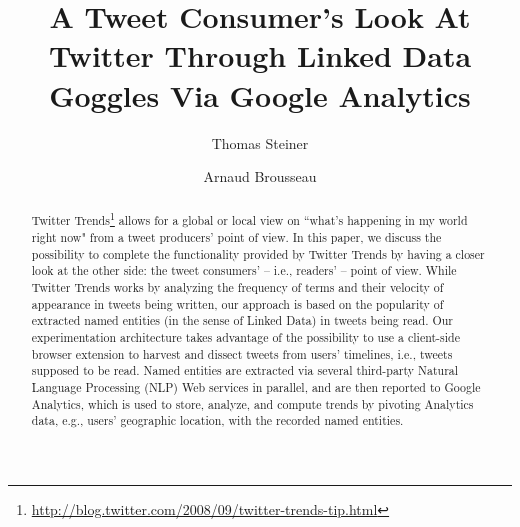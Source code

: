 \documentclass[runningheads,a4paper]{llncs}
\begin{document}
\mainmatter  %

\title{A Tweet Consumer's Look At Twitter Through Linked Data Goggles Via Google Analytics}


%
%
\author{Thomas Steiner \and Arnaud Brousseau}

%
%


\maketitle

\begin{abstract}
Twitter Trends\footnote{\url{http://blog.twitter.com/2008/09/twitter-trends-tip.html}} allows for a global or local view on ``what's happening in my world right now" from a tweet producers' point of view. In this paper, we discuss the possibility to complete the functionality provided by Twitter Trends by having a closer look at the other side: the tweet consumers' -- i.e., readers' -- point of view. While Twitter Trends works by analyzing the frequency of terms and their velocity of appearance in tweets being written, our approach is based on the popularity of extracted named entities (in the sense of Linked Data) in tweets being read. Our experimentation architecture takes advantage of the possibility to use a client-side browser extension to harvest and dissect tweets from users' timelines, i.e., tweets supposed to be read. Named entities are extracted via several third-party Natural Language Processing (NLP) Web services in parallel, and are then reported to Google Analytics, which is used to store, analyze, and compute trends by pivoting Analytics data, e.g., users' geographic location, with the recorded named entities.
\end{abstract}
\end{document}
